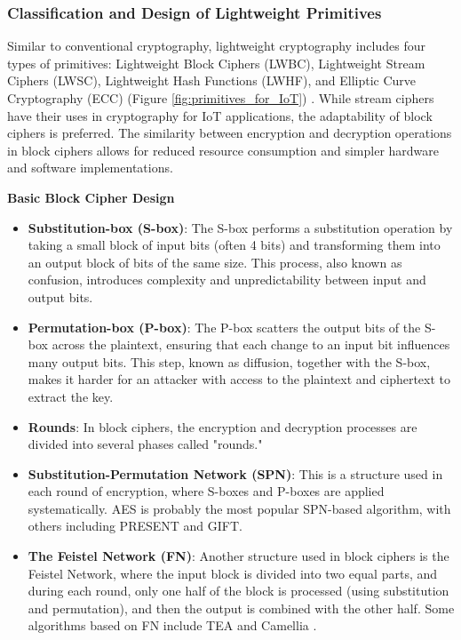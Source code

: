 \documentclass[a4paper,11pt, twoside]{article}
\begin{document}
\subsubsection{Classification and Design of Lightweight Primitives}
Similar to conventional cryptography, lightweight cryptography includes four types of primitives: Lightweight Block Ciphers (LWBC), Lightweight Stream Ciphers (LWSC), Lightweight Hash Functions (LWHF), and Elliptic Curve Cryptography (ECC) (Figure \ref{fig:primitives_for_IoT}) \cite{dhanda2020lightweight}. While stream ciphers have their uses in cryptography for IoT applications, the adaptability of block ciphers is preferred. The similarity between encryption and decryption operations in block ciphers allows for reduced resource consumption and simpler hardware and software implementations.

\textbf{Basic Block Cipher Design}
\begin{itemize}
    \item \textbf{Substitution-box (S-box)}: The S-box performs a substitution operation by taking a small block of input bits (often 4 bits) and transforming them into an output block of bits of the same size. This process, also known as confusion, introduces complexity and unpredictability between input and output bits.
    \item \textbf{Permutation-box (P-box)}: The P-box scatters the output bits of the S-box across the plaintext, ensuring that each change to an input bit influences many output bits. This step, known as diffusion, together with the S-box, makes it harder for an attacker with access to the plaintext and ciphertext to extract the key.
    \item \textbf{Rounds}: In block ciphers, the encryption and decryption processes are divided into several phases called "rounds."
    \item \textbf{Substitution-Permutation Network (SPN)}: This is a structure used in each round of encryption, where S-boxes and P-boxes are applied systematically. AES is probably the most popular SPN-based algorithm, with others including PRESENT and GIFT.
    \item \textbf{The Feistel Network (FN)}: Another structure used in block ciphers is the Feistel Network, where the input block is divided into two equal parts, and during each round, only one half of the block is processed (using substitution and permutation), and then the output is combined with the other half. Some algorithms based on FN include TEA and Camellia \cite{ekwueme2024lightweight} \cite{chauhan2022analysis}.
\end{itemize}
\end{document}
